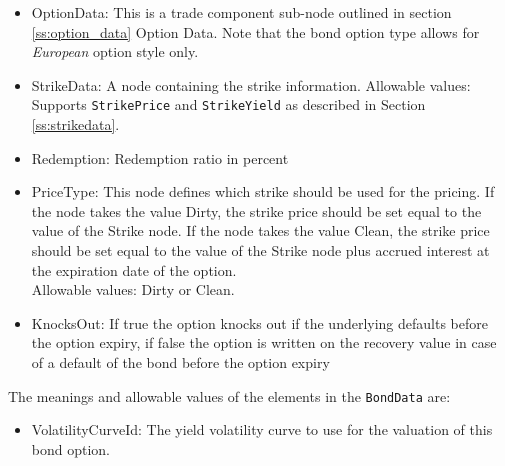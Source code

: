 \begin{itemize}
	\item OptionData: This is a trade component sub-node outlined in section \ref{ss:option_data} Option Data. Note 
	that the bond option type allows for \emph{European} option style only.
  \item StrikeData: A node containing the strike information.
	Allowable values: Supports \lstinline!StrikePrice! and \lstinline!StrikeYield! as described in Section \ref{ss:strikedata}.

  \item Redemption: Redemption ratio in percent
	\item PriceType: This node defines which strike should be used for the pricing. If the node takes the value Dirty, 
	the strike price should be set equal to the value of the Strike node. If the node takes the value Clean, 
	the strike price should be set equal to the value of the Strike node plus accrued interest at the expiration date of the option.\\
	Allowable values: Dirty or Clean.
  \item KnocksOut: If true the option knocks out if the underlying defaults before the option expiry, if false the
    option is written on the recovery value in case of a default of the bond before the option expiry
\end{itemize}

The meanings and allowable values of the elements in the \lstinline!BondData! are:

\begin{itemize}
  \item VolatilityCurveId: The yield volatility curve to use for the valuation of this bond option.
\end{itemize}
